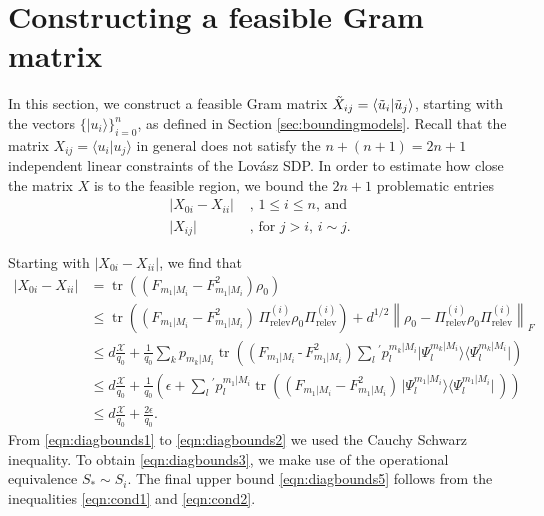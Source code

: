 \section{Constructing a feasible Gram matrix}

In this section, we construct a feasible Gram matrix $\Tilde{X}_{ij}=\langle \Tilde{u}_i \vert \Tilde{u}_j \rangle$, starting with the vectors $\{\vert u_i \rangle \}_{i=0}^n$, as defined in Section \ref{sec:boundingmodels}. Recall that the matrix $X_{ij}=\langle u_i \vert u_j \rangle$ in general does not satisfy the $n+(n+1)=2n+1$ independent linear constraints of the Lovász SDP. In order to estimate how close the matrix $X$ is to the feasible region, we bound the $2n+1$ problematic entries
\begin{align}
\vert X_{0i}-X_{ii}\vert &\text{ , $1\leq i \leq n$, and} \\
\vert X_{ij} \vert & \text{ , for $j>i$, $i\sim j$.}
\end{align}

Starting with $\vert X_{0i} - X_{ii}\vert$,  we find that
\doublespacing
\begin{align}
\label{eqn:diagbounds1}
\vert X_{0i} - X_{ii} \vert & = \operatorname{tr}\left((F_{m_1\vert M_i}-F_{m_1\vert M_i}^2)\rho_0\right) \\[0.75em]
\label{eqn:diagbounds2}
& \leq \operatorname{tr}\left((F_{m_1\vert M_i}-F_{m_1\vert M_i}^2)\,\Pi_{\text{relev}}^{(i)}\rho_0\Pi_{\text{relev}}^{(i)}\right)+d^{1/2}\left\|\rho_0 - \Pi_{\text{relev}}^{(i)}\rho_0\Pi_{\text{relev}}^{(i)}\right\|_F\\[0.75em]
\label{eqn:diagbounds3}
& \leq d\frac{\mathcal{X}}{q_0}+\frac{1}{q_0}\sum_k p_{m_k\vert M_i} \operatorname{tr}\left((F_{m_1\vert M_i}\,\text{-}\,F_{m_1\vert M_i}^2)\sum_l {}^{'} p_l^{m_k\vert M_i}\vert \Psi_l^{m_k \vert M_i}\rangle \langle \Psi_l^{m_k\vert M_i}\vert\right)\\[0.75em]
\label{eqn:diagbounds4}
& \leq d\frac{\mathcal{X}}{q_0}+\frac{1}{q_0}\left(\epsilon + \sum_l {}^{'} p_l^{m_1\vert M_i}\operatorname{tr}\left((F_{m_1\vert M_i}-F_{m_1\vert M_i}^2)\, \vert \Psi_l^{m_1 \vert M_i}\rangle \langle \Psi_l^{m_1\vert M_i}\vert\,\right)\right) \\[0.75em]
\label{eqn:diagbounds5}
& \leq d\frac{\mathcal{X}}{q_0}+\frac{2 \epsilon}{q_0}.
\end{align}
\onehalfspacing
From \ref{eqn:diagbounds1} to \ref{eqn:diagbounds2} we used the Cauchy Schwarz inequality. To obtain \ref{eqn:diagbounds3}, we make use of the operational equivalence $S_* \sim S_i$. The final upper bound \ref{eqn:diagbounds5} follows from the inequalities \ref{eqn:cond1} and \ref{eqn:cond2}. 

